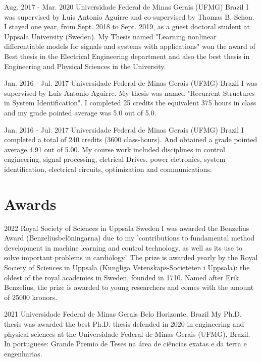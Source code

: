 \documentclass[10pt,letterpaper]{article} %
\begin{document}
    { Aug. 2017 - Mar. 2020 }
    { Universidade Federal de Minas Gerais (UFMG) }
    { Brazil }
    { I was supervised by Luis Antonio Aguirre and co-supervised by Thomas B. Schon.  I stayed one year, from Sept. 2018 to Sept. 2019, as a guest doctoral student at Uppsala University (Sweden). My Thesis named "Learning nonlinear differentiable models for signals and systems with applications" won the award of Best thesis in the Electrical Engineering department and also the best thesis in Engineering and Physical Sciences in the University. }

    { Jan. 2016 - Jul. 2017 }
    { Universidade Federal de Minas Gerais (UFMG) }
    { Brazil }
    { I was supervised by Luis Antonio Aguirre. My thesis was named "Recurrent Structures in System Identification". I completed 25 credits the equivalent 375 hours in class and my grade pointed average was 5.0 out of 5.0. }

    { Jan. 2016 - Jul. 2017 }
    { Universidade Federal de Minas Gerais (UFMG) }
    { Brazil }
    { I completed a total of 240  credits (3600 class-hours). And obtained a grade pointed average 4.91 out of 5.00. My course work included disciplines in control engineering, signal processing, eletrical Drives, power eletronics, system identification, electrical circuits, optimization and communications. }



\section*{Awards}


    { 2022 }
    { Royal Society of Sciences in Uppsala }
    { Sweden }
    { I was awarded the Benzelius Award (Benzeliusbelöningarna) due to my 'contributions to fundamental method development in machine learning and control technology, as well as its use to solve important problems in cardiology'. The prize is awarded yearly by the Royal Society of Sciences in Uppsala (Kungliga Vetenskaps-Societeten i Uppsala): the oldest of the royal academies in Sweden, founded in 1710. Named after Erik Benzelius, the prize is awarded to young researchers and comes with the amount of 25000 kronors. }

    { 2021 }
    { Universidade Federal de Minas Gerais }
    { Belo Horizonte, Brazil }
    { My Ph.D. thesis was awarded the best Ph.D. thesis defended in 2020 in engineering and physical sciences at the Universidade Federal de Minas Gerais (UFMG), Brazil. In portuguese: Grande Premio de Teses na área de ciências exatas e da terra e engenharias. }
\end{document}
